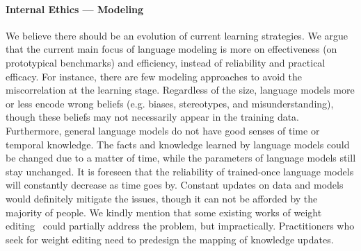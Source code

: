 \paragraph{Internal Ethics --- Modeling} We believe there should be an evolution of current learning strategies. We argue that the current main focus of language modeling is more on effectiveness (on prototypical benchmarks) and efficiency, instead of reliability and practical efficacy. For instance, there are few modeling approaches to avoid the miscorrelation at the learning stage. Regardless of the size, language models more or less encode wrong beliefs (e.g. biases, stereotypes, and misunderstanding), though these beliefs may not necessarily appear in the training data. Furthermore, general language models do not have good senses of time or temporal knowledge. The facts and knowledge learned by language models could be changed due to a matter of time, while the parameters of language models still stay unchanged. It is foreseen that the reliability of trained-once language models will constantly decrease as time goes by. Constant updates on data and models would definitely mitigate the issues, though it can not be afforded by the majority of people. We kindly mention that some existing works of weight editing~\cite{mitchellfast,DeCao2021EditingFK,Zhu2020ModifyingMI} could partially address the problem, but impractically. Practitioners
who seek for weight editing need to predesign the mapping of knowledge updates.


